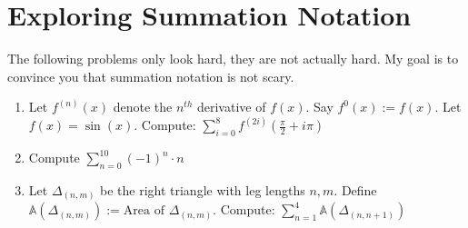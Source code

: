 \documentclass{article}
\begin{document}
\section*{Exploring Summation Notation}
The following problems only look hard, they are not actually hard. My goal is to convince you that summation notation is not scary.
\begin{enumerate}
    \item Let $f^{(n)}(x)$ denote the $n^{th}$ derivative of $f(x)$. Say $f^0(x) := f(x)$. Let $f(x) = \sin(x)$. Compute:
    \newline
    $\sum\limits_{i = 0}^8 f^{(2i)}(\frac{\pi}{2}+i\pi)$
    \vfill
    \item Compute $\sum\limits_{n = 0}^{10} (-1)^n \cdot n$
    \vfill
    \item Let $\Delta_{(n, m)}$ be the right triangle with leg lengths $n, m$. Define $\mathbb{A}(\Delta_{(n, m)}) := \text{Area of } \Delta_{(n, m)}$. Compute:
    \newline
    $\sum\limits_{n = 1}^4 \mathbb{A}(\Delta_{(n, n+1)})$
    \vfill
\end{enumerate}
\end{document}

